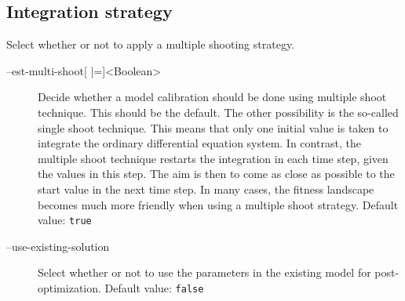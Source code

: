 \subsection{Integration strategy}

Select whether or not to apply a multiple shooting strategy.
\begin{description}
\item[--est-multi-shoot{[} |={]}<Boolean>]
          Decide whether a model calibration should be done using multiple
          shoot technique. This should be the default. The other possibility
          is the so-called single shoot technique. This means that only
          one initial value is taken to integrate the ordinary differential
          equation system. In contrast, the multiple shoot technique restarts
          the integration in each time step, given the values in this step.
          The aim is then to come as close as possible to the start value
          in the next time step. In many cases, the fitness landscape becomes
          much more friendly when using a multiple shoot strategy.
          Default value: \texttt{true}
\item[--use-existing-solution]
          Select whether or not to use the parameters in the existing model
          for post-optimization.
          Default value: \texttt{false}
\end{description}

